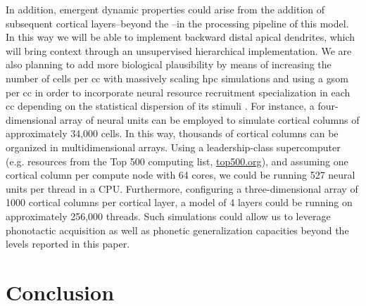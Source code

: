 \documentclass[10pt,letterpaper]{article}
\begin{document}
In addition, emergent dynamic properties could arise from the addition of subsequent cortical layers--beyond the --in the processing pipeline of this model.  In this way we will be able to implement backward distal apical dendrites, which will bring context through an unsupervised hierarchical implementation. We are also planning to add more biological plausibility by means of increasing the number of cells per \gls{cc} with massively scaling \gls{hpc} simulations and using a \gls{gsom} per \gls{cc} in order to incorporate neural resource recruitment specialization in each \gls{cc} depending on the statistical dispersion of its stimuli \cite{Meyer19113}. For instance, a four-dimensional array of neural units can be employed to simulate cortical columns of approximately 34,000 cells. In this way, thousands of cortical columns can be organized in multidimensional arrays. Using a leadership-class supercomputer (e.g. resources from the Top 500 computing list, \url{top500.org}), and assuming one cortical column per compute node with 64 cores, we could be running 527 neural units per thread in a CPU. Furthermore, configuring a three-dimensional array of 1000 cortical columns per cortical layer, a model of 4 layers could be running on approximately 256,000 threads. Such simulations could allow us to leverage phonotactic acquisition as well as phonetic generalization capacities beyond the levels reported in this paper.








\section*{Conclusion}


\end{document}
